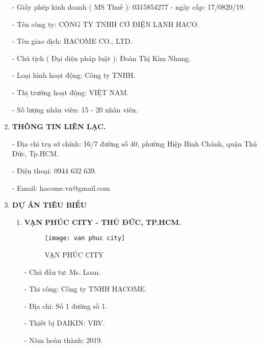 \documentclass[12pt,a4paper]{article}
\begin{document}
\begin{enumerate}
\hspace{1cm} - Giấy phép kinh doanh ( MS Thuế ): 0315854277 - ngày cấp: 17/0820/19.

\hspace{1cm} - Tên công ty: CÔNG TY TNHH CƠ ĐIỆN LẠNH HACO.

\hspace{1cm} - Tên giao dịch: HACOME CO., LTD.

\hspace{1cm} - Chủ tịch ( Đại diện pháp luật ): Đoàn Thị Kim Nhung.

\hspace{1cm} - Loại hình hoạt động: Công ty TNHH.

\hspace{1cm} - Thị trường hoạt động: VIỆT NAM.

\hspace{1cm} - Số lượng nhân viên: 15 - 20 nhân viên.

\item \textbf{THÔNG TIN LIÊN LẠC.}

\hspace{1cm} - Địa chỉ trụ sở chính: 16/7 đường số 40, phường Hiệp Bình Chánh, quận Thủ Đức, Tp.HCM.

\hspace{1cm} - Điện thoại: 0944 632 639.

\hspace{1cm} - Email: hacome.vn@gmail.com


\item \textbf{DỰ ÁN TIÊU BIỂU}

\begin{enumerate}
\item \textbf{VẠN PHÚC CITY - THỦ ĐỨC, TP.HCM.}
\begin{figure}[htbp]
  \centering
  \texttt{[image: van phuc city]}
  \caption{VẠN PHÚC CITY}
\end{figure}

\hspace{1cm} - Chủ đầu tư: Ms. Loan.

\hspace{1cm} - Thi công: Công ty TNHH HACOME.

\hspace{1cm} - Địa chỉ: Số 1 đường số 1.

\hspace{1cm} - Thiết bị DAIKIN: VRV.

\hspace{1cm} - Năm hoàn thành: 2019.


\end{enumerate}
\end{enumerate}
\end{document}
